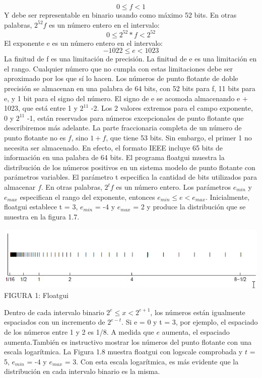 \documentclass[12pt]{article}
\begin{document}
$$0 \leq{f} < 1$$
Y debe ser representable en binario usando como máximo 52 bits. En otras palabras, $2^{52}f$ es un número entero en el intervalo:
$$0 \leq{2^{52}*f} < 2^{52}$$
El exponente e es un número entero en el intervalo:
$$-1022 \leq{e} < 1023$$
La finitud de f es una limitación de precisión. La finitud de e es una limitación en el rango.
Cualquier número que no cumpla con estas limitaciones debe ser aproximado por los que sí lo hacen.
Los números de punto flotante de doble precisión se almacenan en una palabra de 64 bits, con 52 bits para f, 11 bits para e, y 1 bit para el signo del número. El signo de e se acomoda almacenando e + 1023, que está entre 1 y $2^{11}$ -2. Los 2 valores extremos para el campo exponente, 0 y $2^{11}$ -1, están reservados para números excepcionales de punto flotante que describiremos más adelante.
La parte fraccionaria completa de un número de punto flotante no es $f$, sino $1 + f$, que tiene 53 bits. Sin embargo, el primer 1 no necesita ser almacenado. En efecto, el formato IEEE incluye 65 bits de información en una palabra de 64 bits.
El programa floatgui muestra la distribución de los números positivos en un sistema modelo
de punto flotante con parámetros variables. El parámetro t especifica la cantidad de bits
utilizados para almacenar $f$. En otras palabras, $2 ^ tf$ es un número entero. Los parámetros
$e_{min}$ y $e_{max}$ especifican el rango del exponente, entonces $e_{min} \leq{e} < e_{max}$. Inicialmente,
floatgui establece t = 3, $e_{min}$ = -4 y $e_{max}$ = 2 y produce la distribución que se muestra en la
figura 1.7.
\begin{center}
  \includegraphics[scale=0.65]{fig1}
  FIGURA 1: Floatgui
\end{center}
Dentro de cada intervalo binario $2^e \leq{x} < 2^{e+1}$, los números están igualmente espaciados
con un incremento de $2^{e-t}$. Si e = 0 y t = 3, por ejemplo, el espaciado de los números
entre 1 y 2 es 1/8. A medida que $e$ aumenta, el espaciado aumenta.También es instructivo mostrar los números del punto flotante con una escala logarítmica. La
Figura 1.8 muestra floatgui con logscale comprobada y $t$ = 5, $e_{min}$ = -4 y $e_{max}$ = 3. Con esta
escala logarítmica, es más evidente que la distribución en cada intervalo binario es la misma.
\end{document}
